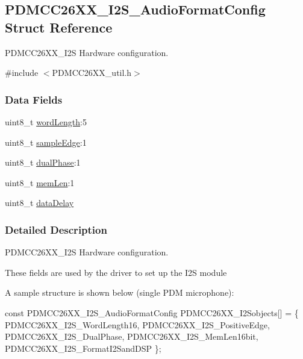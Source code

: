 \subsection{P\+D\+M\+C\+C26\+X\+X\+\_\+\+I2\+S\+\_\+\+Audio\+Format\+Config Struct Reference}
\label{struct_p_d_m_c_c26_x_x___i2_s___audio_format_config}


P\+D\+M\+C\+C26\+X\+X\+\_\+\+I2\+S Hardware configuration.  




{\ttfamily \#include $<$P\+D\+M\+C\+C26\+X\+X\+\_\+util.\+h$>$}

\subsubsection*{Data Fields}
\begin{DoxyCompactItemize}
\item 
uint8\+\_\+t \hyperlink{struct_p_d_m_c_c26_x_x___i2_s___audio_format_config_a43c47e956fdcdd7b0e1eee61553f3607}{word\+Length}\+:5
\item 
uint8\+\_\+t \hyperlink{struct_p_d_m_c_c26_x_x___i2_s___audio_format_config_a48600a4eaee3c7b9e26a2eb826da68b5}{sample\+Edge}\+:1
\item 
uint8\+\_\+t \hyperlink{struct_p_d_m_c_c26_x_x___i2_s___audio_format_config_a45a99f82001d8cdc96361eab8ea6fff3}{dual\+Phase}\+:1
\item 
uint8\+\_\+t \hyperlink{struct_p_d_m_c_c26_x_x___i2_s___audio_format_config_aa6310978bb3efcf50aab7226f34597b1}{mem\+Len}\+:1
\item 
uint8\+\_\+t \hyperlink{struct_p_d_m_c_c26_x_x___i2_s___audio_format_config_a8fbefceb8a0609ab4dee5beeecec98e6}{data\+Delay}
\end{DoxyCompactItemize}


\subsubsection{Detailed Description}
P\+D\+M\+C\+C26\+X\+X\+\_\+\+I2\+S Hardware configuration. 

These fields are used by the driver to set up the I2\+S module

A sample structure is shown below (single P\+D\+M microphone)\+: 
\begin{DoxyCode}
\textcolor{keyword}{const} PDMCC26XX_I2S_AudioFormatConfig PDMCC26XX\_I2Sobjects[] = \{
        PDMCC26XX_I2S_WordLength16,
        PDMCC26XX_I2S_PositiveEdge,
        PDMCC26XX_I2S_DualPhase,
        PDMCC26XX_I2S_MemLen16bit,
        PDMCC26XX_I2S_FormatI2SandDSP
\};
\end{DoxyCode}
 

